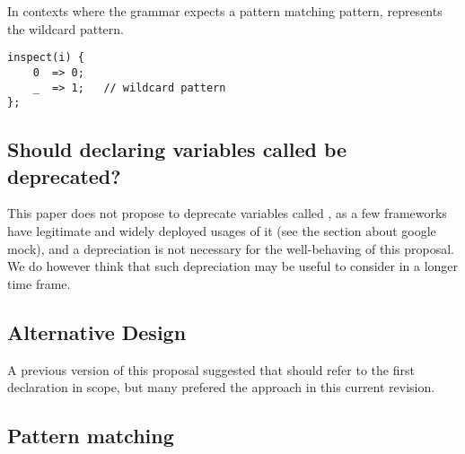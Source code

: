 \documentclass{wg21}
\begin{document}
In contexts where the grammar expects a pattern matching pattern, \tcode{_} represents the wildcard pattern.

\begin{lstlisting}[style=color]
inspect(i) {
    0  => 0;
    _  => 1;   // wildcard pattern
};
\end{lstlisting}

\subsection{Should declaring variables called \tcode{_} be deprecated?}

This paper does not propose to deprecate variables called \tcode{_}, as a few frameworks have legitimate and widely deployed usages of it
(see the section about google mock), and a depreciation is not necessary for the well-behaving of this proposal.
We do however think that such depreciation may be useful to consider in a longer time frame.

\subsection{Alternative Design}

A previous version of this proposal suggested that \tcode{_} should refer to the first declaration in scope,
but many prefered the approach in this current revision.

\subsection{Pattern matching}
\end{document}
